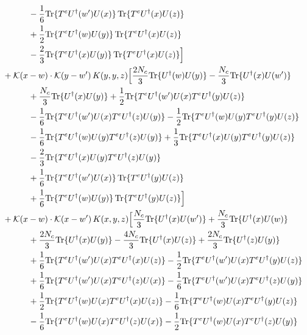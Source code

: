 \documentclass[10pt]{article}
\numberwithin{equation}{section}
\begin{document}
\begin{align}
&\quad\quad\quad-\frac{1}{6}{\rm Tr}\{T^eU^\dagger(w')U(x)\}\,{\rm Tr}\{T^eU^\dagger(x)U(z)\}\notag\\
&\quad\quad\quad+\frac{1}{2}{\rm Tr}\{T^eU^\dagger(w)U(y)\}\,{\rm Tr}\{T^eU^\dagger(x)U(z)\}\notag\\
&\quad\quad\quad-\frac{2}{3}{\rm Tr}\{T^eU^\dagger(x)U(y)\}\,{\rm Tr}\{T^eU^\dagger(x)U(z)\}\Big]\notag\\
&+\mathcal K(x-w)\cdot\mathcal K(y-w')\,K(y,y,z)\Big[\frac{2 N_c}{3}{\rm Tr}\{U^\dagger(w)U(y)\}-\frac{N_c}{3}{\rm Tr}\{U^\dagger(x)U(w')\}\notag\\
&\quad\quad\quad+\frac{N_c}{3}{\rm Tr}\{U^\dagger(x)U(y)\}+\frac{1}{2}{\rm Tr}\{T^eU^\dagger(w')U(x)T^eU^\dagger(y)U(z)\}\notag\\
&\quad\quad\quad-\frac{1}{6}{\rm Tr}\{T^eU^\dagger(w')U(x)T^eU^\dagger(z)U(y)\}-\frac{1}{2}{\rm Tr}\{T^eU^\dagger(w)U(y)T^eU^\dagger(y)U(z)\}\notag\\
&\quad\quad\quad-\frac{1}{6}{\rm Tr}\{T^eU^\dagger(w)U(y)T^eU^\dagger(z)U(y)\}+\frac{1}{3}{\rm Tr}\{T^eU^\dagger(x)U(y)T^eU^\dagger(y)U(z)\}\notag\\
&\quad\quad\quad-\frac{2}{3}{\rm Tr}\{T^eU^\dagger(x)U(y)T^eU^\dagger(z)U(y)\}\notag\\
&\quad\quad\quad+\frac{1}{6}{\rm Tr}\{T^eU^\dagger(w')U(x)\}\,{\rm Tr}\{T^eU^\dagger(y)U(z)\}\notag\\
&\quad\quad\quad+\frac{1}{6}{\rm Tr}\{T^eU^\dagger(w)U(y)\}\,{\rm Tr}\{T^eU^\dagger(y)U(z)\}\Big]\notag\\
&+\mathcal K(x-w)\cdot\mathcal K(x-w')\,K(x,y,z)\Big[\frac{N_c}{3}{\rm Tr}\{U^\dagger(x)U(w')\}+\frac{N_c}{3}{\rm Tr}\{U^\dagger(x)U(w)\}\notag\\
&\quad\quad\quad+\frac{2 N_c}{3}{\rm Tr}\{U^\dagger(x)U(y)\}-\frac{4 N_c}{3}{\rm Tr}\{U^\dagger(x)U(z)\}+\frac{2 N_c}{3}{\rm Tr}\{U^\dagger(z)U(y)\}\notag\\
&\quad\quad\quad+\frac{1}{6}{\rm Tr}\{T^eU^\dagger(w')U(x)T^eU^\dagger(x)U(z)\}-\frac{1}{2}{\rm Tr}\{T^eU^\dagger(w')U(x)T^eU^\dagger(y)U(z)\}\notag\\
&\quad\quad\quad+\frac{1}{6}{\rm Tr}\{T^eU^\dagger(w')U(x)T^eU^\dagger(z)U(x)\}-\frac{1}{6}{\rm Tr}\{T^eU^\dagger(w')U(x)T^eU^\dagger(z)U(y)\}\notag\\
&\quad\quad\quad+\frac{1}{2}{\rm Tr}\{T^eU^\dagger(w)U(x)T^eU^\dagger(x)U(z)\}-\frac{1}{6}{\rm Tr}\{T^eU^\dagger(w)U(x)T^eU^\dagger(y)U(z)\}\notag\\
&\quad\quad\quad-\frac{1}{6}{\rm Tr}\{T^eU^\dagger(w)U(x)T^eU^\dagger(z)U(x)\}-\frac{1}{2}{\rm Tr}\{T^eU^\dagger(w)U(x)T^eU^\dagger(z)U(y)\}\notag\\

\end{align}
\end{document}
